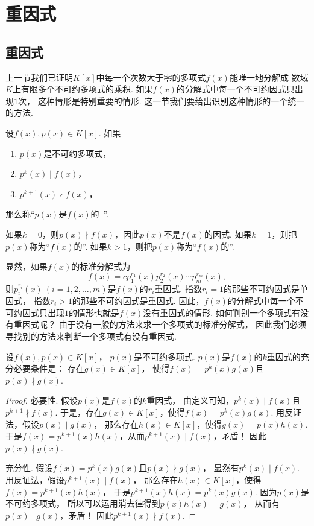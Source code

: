 \section{重因式}
\subsection{重因式}
上一节我们已证明\(K[x]\)中每一个次数大于零的多项式\(f(x)\)能唯一地分解成
数域\(K\)上有限多个不可约多项式的乘积.
如果\(f(x)\)的分解式中每一个不可约因式只出现\(1\)次，
这种情形是特别重要的情形.
这一节我们要给出识别这种情形的一个统一的方法.

\begin{definition}
设\(f(x),p(x) \in K[x]\).
如果\begin{enumerate}
	\item \(p(x)\)是不可约多项式，
	\item \(p^k(x) \mid f(x)\)，
	\item \(p^{k+1}(x) \nmid f(x)\)，
\end{enumerate}
那么称“\(p(x)\)是\(f(x)\)的~”.

如果\(k=0\)，则\(p(x) \nmid f(x)\)，因此\(p(x)\)不是\(f(x)\)的因式.
如果\(k=1\)，则把\(p(x)\)称为“\(f(x)\)的”.
如果\(k>1\)，则把\(p(x)\)称为“\(f(x)\)的”.
\end{definition}

显然，如果\(f(x)\)的标准分解式为\[
	f(x) = c p_1^{r_1}(x) p_2^{r_2}(x) \dotsm p_m^{r_m}(x),
\]
则\(p_i^{r_i}(x)\ (i=1,2,\dotsc,m)\)是\(f(x)\)的\(r_i\)重因式.
指数\(r_i = 1\)的那些不可约因式是单因式，
指数\(r_i > 1\)的那些不可约因式是重因式.
因此，\(f(x)\)的分解式中每一个不可约因式只出现\(1\)的情形也就是\(f(x)\)没有重因式的情形.
如何判别一个多项式有没有重因式呢？
由于没有一般的方法来求一个多项式的标准分解式，
因此我们必须寻找别的方法来判断一个多项式有没有重因式.

\begin{proposition}\label{theorem:多项式.重因式的等价定义}
设\(f(x),p(x) \in K[x]\)，
\(p(x)\)是不可约多项式.
\(p(x)\)是\(f(x)\)的\(k\)重因式的充分必要条件是：
存在\(g(x) \in K[x]\)，
使得\(f(x) = p^k(x) g(x)\)且\(p(x) \nmid g(x)\).
\begin{proof}
必要性.
假设\(p(x)\)是\(f(x)\)的\(k\)重因式，
由定义可知，\(p^k(x) \mid f(x)\)且\(p^{k+1} \nmid f(x)\).
于是，存在\(g(x) \in K[x]\)，使得\(f(x) = p^k(x) g(x)\).
用反证法，假设\(p(x) \mid g(x)\)，
那么存在\(h(x) \in K[x]\)，使得\(g(x) = p(x) h(x)\).
于是\(f(x) = p^{k+1}(x) h(x)\)，从而\(p^{k+1}(x) \mid f(x)\)，矛盾！
因此\(p(x) \nmid g(x)\).

充分性.
假设\(f(x) = p^k(x) g(x)\)且\(p(x) \nmid g(x)\)，
显然有\(p^k(x) \mid f(x)\).
用反证法，假设\(p^{k+1}(x) \mid f(x)\)，
那么存在\(h(x) \in K[x]\)，使得\(f(x) = p^{k+1}(x) h(x)\)，
于是\(p^{k+1}(x) h(x) = p^k(x) g(x)\).
因为\(p(x)\)是不可约多项式，
所以可以运用消去律得到\(p(x) h(x) = g(x)\)，
从而有\(p(x) \mid g(x)\)，矛盾！
因此\(p^{k+1}(x) \nmid f(x)\).
\end{proof}
\end{proposition}

